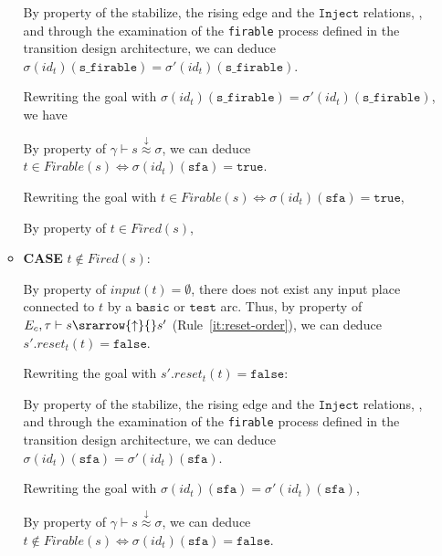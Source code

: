 \documentclass[dvipsnames,12pt]{article}
\begin{document}
\begin{niproof}
\begin{itemize}
\begin{itemize}
      By property of the stabilize, the \hvhdl{} rising edge and the
      $\mathtt{Inject}$ relations, \InCsCompT, and through the
      examination of the \texttt{firable} process defined in the
      transition design architecture, we can deduce\\
      $\sigma(id_t)(\texttt{s\_firable})=\sigma'(id_t)(\texttt{s\_firable})$.

      Rewriting the goal with
      $\sigma(id_t)(\texttt{s\_firable})=\sigma'(id_t)(\texttt{s\_firable})$,
      we have \\

      By property of
      $\gamma\vdash{}s\stackrel{\downarrow}{\approx}\sigma$, we can
      deduce
      $t\in{}Firable(s)\Leftrightarrow\sigma(id_t)(\texttt{sfa})=\mathtt{true}$.

      Rewriting the goal with
      $t\in{}Firable(s)\Leftrightarrow\sigma(id_t)(\texttt{sfa})=\mathtt{true}$,

      By property of $t\in{}Fired(s)$, 
      
    \item \textbf{CASE} $t\notin{}Fired(s)$:

      \noindent{}By property of $input(t)=\emptyset$, there does not
      exist any input place connected to $t$ by a $\mathtt{basic}$ or
      $\mathtt{test}$ arc. Thus, by property of
      $E_c,\tau\vdash{}s\srarrow{\uparrow}{\fontsize{7}{7}\selectfont}s'$
      (Rule~\ref{it:reset-order}), we can deduce
      $s'.reset_t(t)=\mathtt{false}$.

      Rewriting the goal with $s'.reset_t(t)=\mathtt{false}$:

      By property of the stabilize, the \hvhdl{} rising edge and the
      $\mathtt{Inject}$ relations, \InCsCompT, and through
      the examination of the \texttt{firable} process defined in the
      transition design architecture, we can deduce
      $\sigma(id_t)(\texttt{sfa})=\sigma'(id_t)(\texttt{sfa})$.

      Rewriting the goal with
      $\sigma(id_t)(\texttt{sfa})=\sigma'(id_t)(\texttt{sfa})$,

      By property of
      $\gamma\vdash{}s\stackrel{\downarrow}{\approx}\sigma$, we can
      deduce
      $t\notin{}Firable(s)\Leftrightarrow\sigma(id_t)(\texttt{sfa})=\mathtt{false}$.
      

\end{itemize}
\end{itemize}
\end{niproof}
\end{document}
